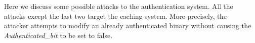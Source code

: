 
Here we discuss some possible attacks to the authentication system.
All the attacks except the last two target the caching system.
More precisely, the attacker attempts to modify an already authenticated
binary without causing the {\it Authenticated\_bit} to be set to false.

